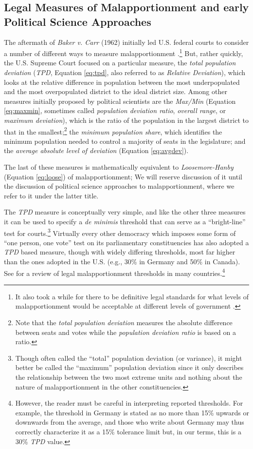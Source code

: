 \subsection*{Legal Measures of Malapportionment and early Political Science Approaches} \label{sec:legal}
%
The aftermath of \textit{Baker v. Carr} (1962) initially led U.S. federal courts to consider a number of different ways to measure malapportionment \citep{NCSL2019}.\footnote{It also took a while for there to be definitive legal standards for what levels of malapportionment would be acceptable at different levels of government \citep{NCSL2019}.} But, rather quickly, the U.S. Supreme Court focused on a particular measure, the \textit{total population deviation} (\textit{TPD}, Equation \ref{eq:tpd}, also referred to as \textit{Relative Deviation}), which looks at the relative difference in population between the most underpopulated and the most overpopulated district to the ideal district size. Among other measures initially proposed by political scientists \citep[see esp.][]{Baker1966} are the \textit{Max/Min} (Equation \ref{eq:maxmin}, sometimes called \textit{population deviation ratio}, \textit{overall range}, or \textit{maximum deviation}), which is the ratio of the population in the largest district to that in the smallest;\footnote{Note that the \textit{total population deviation} measures the absolute difference between seats and votes while the \textit{population deviation ratio} is based on a ratio.} the \textit{minimum population share}, which identifies the minimum population needed to control a majority of seats in the legislature; and the \textit{average absolute level of deviation} (Equation \ref{eq:avgdev}).

The last of these measures is mathematically equivalent to \textit{Loosemore-Hanby} (Equation \ref{eq:loose}) of malapportionment; We will reserve discussion of it until the discussion of political science approaches to malapportionment, where we refer to it under the latter title.

The \textit{TPD} measure is conceptually very simple, and like the other three measures it can be used to specify a \textit{de minimis} threshold that can serve as a ``bright-line'' test for courts.\footnote{Though often called the ``total'' population deviation (or variance), it might better be called the ``maximum'' population deviation since it only describes the relationship between the two most extreme units and nothing about the nature of malapportionment in the other constituencies.} Virtually every other democracy which imposes some form of ``one person, one vote'' test on its parliamentary constituencies has also adopted a \textit{TPD} based measure, though with widely differing thresholds, most far higher than the ones adopted in the U.S. (e.g., 30\% in Germany and 50\% in Canada). See \citep{Handley2008} for a review of legal malapportionment thresholds in many countries.\footnote{However, the reader must be careful in interpreting reported thresholds. For example, the threshold in Germany is stated as no more than 15\% upwards or downwards from the average, and those who write about Germany may thus correctly characterize it as a 15\% tolerance limit but, in our terms, this is a 30\% \textit{TPD} value.}

